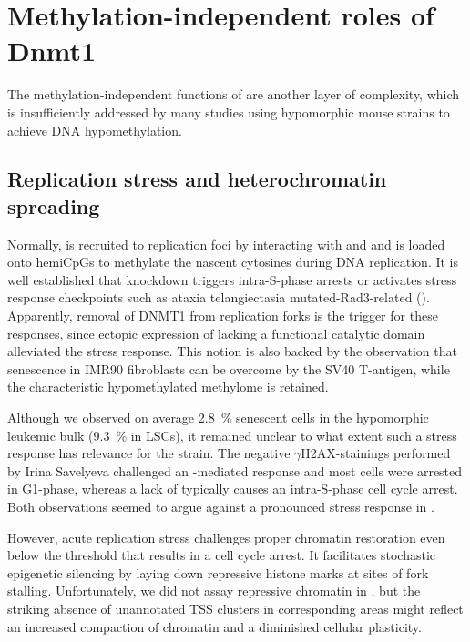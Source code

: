 \section{Methylation-independent roles of Dnmt1}
\label{chap:d:strain:dnmtonealtfunct}

The methylation-independent functions of  are another layer of complexity, which is insufficiently addressed by many studies using hypomorphic  mouse strains to achieve DNA hypomethylation. 

\subsection{Replication stress and heterochromatin spreading}
\label{chap:d:strain:dnmtonealtfunct:hetero}
Normally,  is recruited to replication foci by interacting with   and  \cite{Easwaran2004,Esteve2006} and is loaded onto hemiCpGs to methylate the nascent cytosines during DNA replication. It is well established that  knockdown triggers intra-S-phase arrests\cite{Milutinovic2003} or activates stress response checkpoints such as ataxia telangiectasia mutated-Rad3-related ()\cite{Unterberger2006}. Apparently, removal of DNMT1 from replication forks is the trigger for these responses, since ectopic expression of  lacking a functional catalytic domain alleviated the stress response\cite{Unterberger2006}. This notion is also backed by the observation that senescence in IMR90 fibroblasts can be overcome by the SV40 T-antigen, while the characteristic hypomethylated methylome is retained\cite{Cruickshanks2013}.  
 
Although we observed on average \SI{2.8}{\percent} senescent cells in the hypomorphic leukemic bulk (\SI{9.3}{\percent} in LSCs), it remained unclear to what extent such a stress response has relevance for the \dnmtchip strain. The negative \ensuremath{\gamma}H2AX-stainings performed by Irina Savelyeva challenged an -mediated response and most \dnmtchip cells were arrested in G1-phase\dns, whereas a lack of  typically causes an intra-S-phase cell cycle arrest\cite{Milutinovic2003}. Both observations seemed to argue against a pronounced stress response in \dnmtchip.

However, acute replication stress challenges proper chromatin restoration even below the threshold that results in a cell cycle arrest. It facilitates stochastic epigenetic silencing by laying down repressive histone marks at sites of fork stalling\cite{Jasencakova2010a}. Unfortunately, we did not assay repressive chromatin in \dnmtchip, but the striking absence of unannotated TSS clusters in corresponding areas might reflect an increased compaction of chromatin and a diminished cellular plasticity. 


